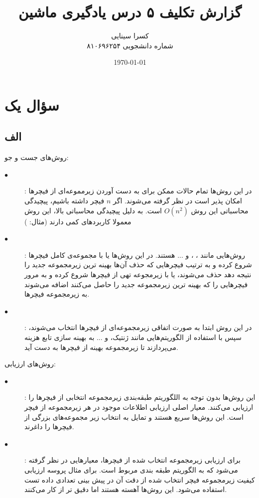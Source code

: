 \documentclass[12pt,onecolumn,a4paper]{article}
\begin{document}
\title{گزارش تکلیف ۵ درس یادگیری ماشین} 
\author{کسرا سینایی\\
شماره دانشجویی ۸۱۰۶۹۶۲۵۴\\
}
\date{\today}
\maketitle
\thispagestyle{empty}
\newpage
\section*{سؤال یک}
\subsection*{الف}
روش‌های جست و جو:
\begin{description}
    \item[$\bullet$] : در این روش‌ها تمام حالات ممکن برای به دست آوردن زیرمموعه‌ای از فیچرها امکان پذیر است در نظر گرفته می‌شوند. اگر $n$ فیچر داشته باشیم، پیچیدگی محاسباتی این روش $O(n^{2})$ است. به دلیل پیچیدگی محاسباتی بالا، این روش معمولا کاربردهای کمی دارند (مثال: )
    \item[$\bullet$] : روش‌هایی مانند ، ،   و ... هستند. در این روش‌ها یا با مجموعه‌ی کامل فیچرها شروع کرده و به ترتیب فیچرهایی که حذف آن‌ها بهینه ترین زیرمجموعه جدید را نتیجه دهد حذف می‌شوند، یا با زیرمجوعه تهی از فیچرها شروع کرده و به مرور فیچرهایی را که بهینه ترین زیرمجموعه جدید را حاصل می‌کنند اضافه می‌شوند به زیرمجموعه فیچرها.
    \item[$\bullet$] : در این روش ابتدا به صورت اتفاقی زیرمجموعه‌ای از فیچرها انتخاب می‌شوند، سپس با استفاده از الگوریتم‌هایی مانند ژنتیک،  و ... به بهینه سازی تابع هزینه می‌پردازند تا زیرمجموعه بهینه از فیچرها به دست آید.
\end{description}
روش‌های ارزیابی:
\begin{description}
    \item[$\bullet$] : این روش‌ها بدون توجه به اللگوریتم طبقه‌بندی زیرمجموعه انتخابی از فیچرها را ارزیابی می‌کنند. معیار اصلی ارزیابی اطلاعات موجود در هر زیرمجموعه از فیچر است. این روش‌ها سریع هستند و تمایل به انتخاب زیر مجموعه‌های بزرگی از فیچرها را داغرند.
    \item[$\bullet$] : برای ارزیابی زیرمجموعه انتخاب شده از فیچرها، معیارهایی در نظر گرفته می‌شود که به الگوریتم طبقه بندی مربوط است. برای مثال پروسه ارزیابی کیفیت زیرمجموعه فیچر انتخاب شده از دقت آن در پیش بینی تعدادی داده تست استفاده می‌شود. این روش‌ها آهسته هستند اما دقیق تر از  کار می‌کنند.
\end{description}
\end{document}
